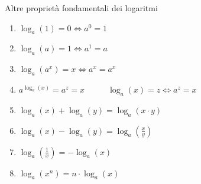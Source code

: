 \documentclass[../main.tex]{subfiles}
\begin{document}
\pagebreak
Altre proprietà fondamentali dei logaritmi
\begin{enumerate}
    \item $\log_a(1) = 0 \Leftrightarrow a^0 = 1$
    \item $\log_a(a) = 1 \Leftrightarrow a^1 = a$
    \item $\log_a(a^x) = x \Leftrightarrow a^x = a^x$
    \item $a^{\log_a(x)} = a^z = x \phantom{---} \log_a(x) = z \Leftrightarrow a^z = x$
    \item $\log_a(x) + \log_a(y) = \log_a(x \cdot y)$
    \item $\log_a(x) - \log_a(y) = \log_a(\frac{x}{y})$
    \item $\log_a(\frac{1}{x}) = -\log_a(x)$
    \item $\log_a(x^n) = n \cdot \log_a(x)$
\end{enumerate}
\end{document}
